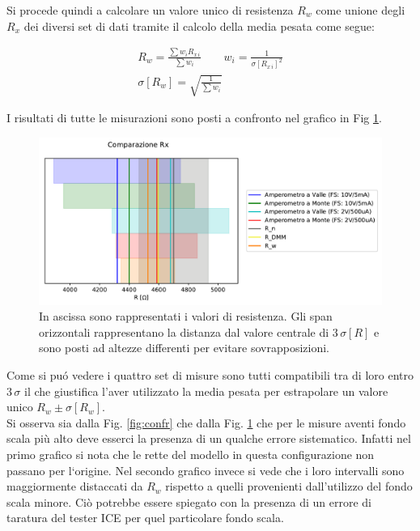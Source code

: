 \documentclass{article}
\begin{document}
Si procede quindi a calcolare un valore unico di resistenza $R_w$ come unione degli $R_x$ dei diversi set di dati tramite il calcolo della media pesata come segue:

\begin{gather}
	R_w = \frac{\sum{w_i R_{x\, i}}}{\sum{w_i}} \qquad w_i = \frac{1}{\sigma[R_{x\, i}]^2} \\
	\nonumber
	\sigma[R_w] = \sqrt{\frac{1}{\sum{w_i}}}
\end{gather}

I risultati di tutte le misurazioni sono posti a confronto nel grafico in Fig \ref{fig:comp}.

\begin{figure}[h]
	\centering
   	\includegraphics[width=\textwidth]{data/fig_comp.pdf} 
   	\caption{\label{fig:comp} In ascissa sono rappresentati i valori di resistenza. Gli span orizzontali rappresentano la distanza dal valore centrale di $3\, \sigma[R]$ e sono posti ad altezze differenti per evitare sovrapposizioni.}
\end{figure}

Come si pu\'o vedere i quattro set di misure sono tutti compatibili tra di loro entro $3\, \sigma$ il che giustifica l'aver utilizzato la media pesata per estrapolare un valore unico $R_w \pm \sigma[R_w]$.\\
Si osserva sia dalla Fig. \ref{fig:confr} che dalla Fig. \ref{fig:comp} che per le misure aventi fondo scala pi\`u alto deve esserci la presenza di un qualche errore sistematico. Infatti nel primo grafico si nota che le rette del modello in questa configurazione non passano per l`origine. Nel secondo grafico invece si vede che i loro intervalli sono maggiormente distaccati da $R_w$ rispetto a quelli provenienti dall'utilizzo del fondo scala minore. Ci\`o potrebbe essere spiegato con la presenza di un errore di taratura del tester ICE per quel particolare fondo scala.
\end{document}
